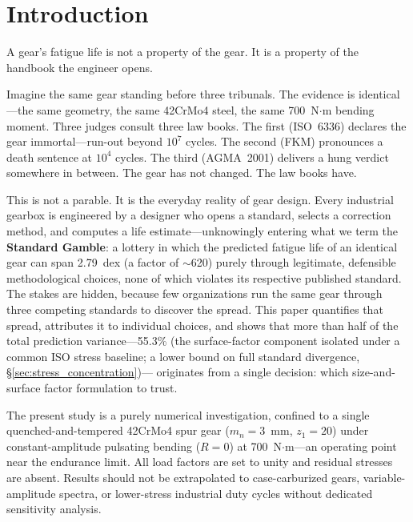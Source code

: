 \documentclass[twocolumn,12pt,a4paper]{article}
\begin{document}
\begin{abstract}
A gear's fatigue life, this study demonstrates, is not stamped into
the steel during heat treatment. It is written---differently---into
every handbook on the engineer's shelf.

\textbf{Keywords:} gear fatigue, uncertainty quantification, AFT survival analysis,
surface roughness, ISO 6336, AGMA 2001, FKM, S--N curve
\end{abstract}

\section{Introduction}
\label{sec:intro}

A gear's fatigue life is not a property of the gear. It is a property
of the handbook the engineer opens.

Imagine the same gear standing before three tribunals. The evidence is
identical---the same geometry, the same 42CrMo4 steel, the same 700~N$\cdot$m
bending moment. Three judges consult three law books. The first (ISO~6336)
declares the gear immortal---run-out beyond $10^7$ cycles. The second
(FKM) pronounces a death sentence at $10^4$ cycles. The third (AGMA~2001)
delivers a hung verdict somewhere in between. The gear has not changed.
The law books have.

This is not a parable. It is the everyday reality of gear design. Every
industrial gearbox is engineered by a designer who opens a standard,
selects a correction method, and computes a life estimate---unknowingly
entering what we term the \textbf{Standard Gamble}: a lottery in which
the predicted fatigue life of an identical gear can span
2.79~dex (a factor of $\sim$620) purely through legitimate, defensible
methodological choices, none of which violates its respective published
standard. The stakes are hidden, because few organizations run the same
gear through three competing standards to discover the spread. This
paper quantifies that spread, attributes it to individual choices, and
shows that more than half of the total prediction variance---55.3\% (the surface-factor component isolated under a common ISO stress baseline; a lower bound on full standard divergence, \S\ref{sec:stress_concentration})--- %
originates from a single decision: which size-and-surface factor formulation to trust.

The present study is a purely numerical investigation, confined to a
single quenched-and-tempered 42CrMo4 spur gear ($m_n=3$~mm,
$z_1=20$) under constant-amplitude pulsating bending ($R=0$) at
700~N$\cdot$m---an operating point near the endurance limit. All
load factors are set to unity and residual stresses are absent.
Results should not be extrapolated to case-carburized gears,
variable-amplitude spectra, or lower-stress industrial duty cycles
without dedicated sensitivity analysis.
\end{document}
